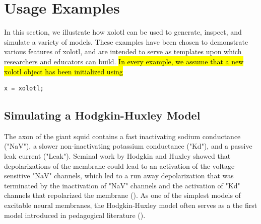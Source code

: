 \documentclass{frontiersSCNS} %
\begin{document}
%
%
%
%
%
%

\section{Usage Examples}
\label{usage}

In this section, we illustrate how xolotl can be used to generate, inspect, and simulate a variety of models. These examples have been chosen to demonstrate various features of xolotl, and are intended to serve as templates upon which researchers and educators can build. \hl{In every example, we assume that a new xolotl object has been initialized using}

\begin{lstlisting}[style=Matlab-editor]
x = xolotl;
\end{lstlisting}

%
%
%
%
%
%

\subsection{Simulating a Hodgkin-Huxley Model}

The axon of the giant squid contains a fast inactivating sodium conductance ("NaV"), a slower non-inactivating potassium conductance ("Kd"), and a passive leak current ("Leak"). Seminal work by Hodgkin and Huxley showed that depolarizations of the membrane could lead to an activation of the voltage-sensitive "NaV" channels, which led to a run away depolarization that was terminated by the inactivation of "NaV" channels and the activation of "Kd" channels that repolarized the membrane (\cite{hodgkinComponentsMembraneConductance1952, hodgkinMeasurementCurrentvoltageRelations1952}). As one of the simplest models of excitable neural membranes, the Hodgkin-Huxley model often serves as a the first model introduced in pedagogical literature (\cite{dayanTheoreticalNeuroscience2001, sterrattPrinciplesComputationalModelling2011, trappenbergFundamentalsComputationalNeuroscience2010}).
\end{document}
